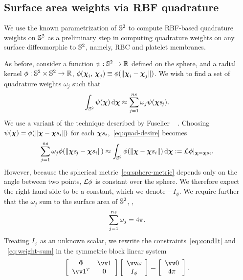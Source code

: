 \subsection{Surface area weights via RBF quadrature}\label{sec:rbf-quadrature}

We use the known parametrization of $\mathbb{S}^2$ to compute RBF-based quadrature weights on
$\mathbb{S}^2$ as a preliminary step in computing quadrature weights on any surface
diffeomorphic to $\mathbb{S}^2$, namely, RBC and platelet membranes.

As before, consider a function $\psi:\mathbb{S}^2\to\mathbb{R}$ defined on the sphere, and a radial
kernel $\phi:\mathbb{S}^2\times\mathbb{S}^2\to\mathbb{R}$,
$\phi(\boldsymbol{\chi}_i,\,\boldsymbol{\chi}_j)\equiv\phi(\|\boldsymbol{\chi}_i-\boldsymbol{\chi}_j\|)$.
We wish to find a set of quadrature weights $\omega_j$ such that
\begin{equation}\label{eq:quad-desire}
    \int_{\sphere} \psi(\Xp) \d\Xp \approx \sum_{j=1}^{\sample\cardinality} \omega_j \psi(\Xpsj).
\end{equation}
We use a variant of the technique described by Fuselier ~%
\cite{Fuselier:2013coba}.  Choosing $\psi(\Xp) = \phi(\|\Xp-\sample\Xp_i\|)$ for each
$\sample\Xp_i$,~\eqref{eq:quad-desire} becomes
\begin{equation}
    \sum_{j=1}^{\sample\cardinality} \omega_j \phi(\|\Xpsj-\sample\Xp_i\|)
    \approx \int_{\sphere}\phi(\|\Xp-\sample\Xp_i\|) \d\Xp := \L\phi|_{\Xp=\sample\Xp_i}.
    \label{eq:cond1t}
\end{equation}
However, because the spherical metric~\eqref{eq:sphere-metric} depends only on the angle
between two points, $\mathcal{L}\phi$ is constant over the sphere. We therefore expect the
right-hand side to be a constant, which we denote $-I_\phi$. We require further that the
$\omega_j$ sum to the surface area of $\mathbb{S}^2$, ,
\begin{equation}\label{eq:weight-sum}
    \sum_{j=1}^{\sample\cardinality} \omega_j  = 4\pi.
\end{equation}
Treating $I_\phi$ as an unknown scalar, we rewrite the constraints~\eqref{eq:cond1t} and%
~\eqref{eq:weight-sum} in the symmetric block linear system %
\begin{equation}\label{eq:rbf-quadrature}
    \left[\begin{array}{cc}
            \Phi & \arr{1} \\ \arr{1}^T & 0
    \end{array}\right]\left[\begin{array}{cc}
            \arr{\omega} \\ I_\phi
    \end{array}\right] = \left[\begin{array}{c}
            \arr{0} \\ 4\pi
    \end{array}\right],
\end{equation}
